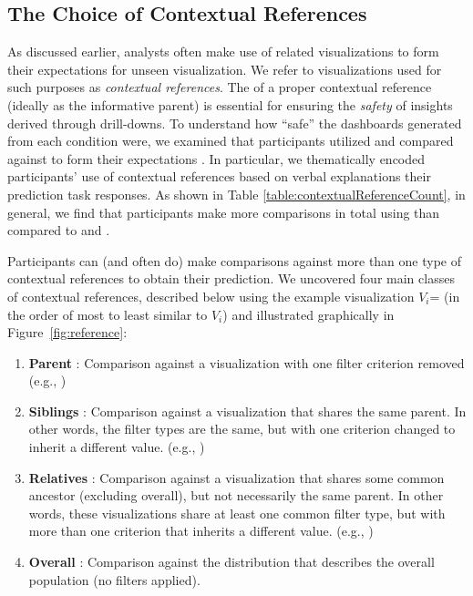 \subsection{The Choice of Contextual References}
\par As discussed earlier, analysts often make use of related visualizations to form their expectations for unseen visualization. We refer to visualizations used for such purposes as \emph{contextual references}. The  of a proper contextual reference (ideally as the informative parent) is essential for ensuring the \emph{safety} of insights derived through drill-downs. To understand how ``safe'' the dashboards generated from each condition were, we examined  that participants utilized and compared against to form their expectations . In particular, we thematically encoded participants' use of contextual references based on  verbal explanations  their prediction task responses. As shown in Table \ref{table:contextualReferenceCount}, in general, we find that participants make more comparisons in total using \system than compared to \cluster and \BFS.
\par Participants can (and often do) make comparisons against more than one type of contextual references to obtain their prediction. We uncovered four main classes of contextual references, described below using the example visualization $V_i$=\texttt{} (in the order of most to least similar to $V_i$) and illustrated graphically in Figure~\ref{fig:reference}:
\begin{enumerate}
	\item \textbf{Parent} : Comparison against a visualization with one filter criterion removed (e.g., \texttt{})
	\item \textbf{Siblings} : Comparison against a visualization that shares the same parent. In other words, the filter types are the same, but with one criterion changed to inherit a different value. (e.g., \texttt{})
	\item \textbf{Relatives} : Comparison against a visualization that shares some common ancestor (excluding overall), but not necessarily the same parent. In other words, these visualizations share at least one common filter type, but with more than one criterion that inherits a different value. (e.g., \texttt{})
	\item \textbf{Overall} : Comparison against the distribution that describes the overall population (no filters applied).
\end{enumerate}
